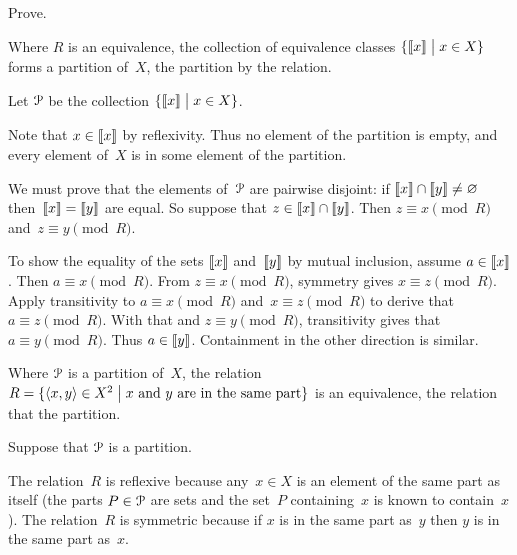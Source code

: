 \documentclass{ibl}  %
\begin{document}
\begin{problem} \label{ex:EquivClassesFormPartition}
Prove.
\begin{exes}
\begin{exercise} 
  Where $R$ is an equivalence, 
  the collection of equivalence classes 
  $\{\llbracket x \rrbracket \bigm| x\in X\}$ forms a partition of~$X$,
  the partition  by the relation.
\end{exercise}
\begin{answer}
  Let $\EuScript{P}$ be the collection $\{\llbracket x \rrbracket \bigm| x\in X\}$.
 
  Note that $x\in\llbracket x \rrbracket$ by reflexivity.
  Thus no element of the partition is empty, and 
  every element of~$X$ is in some element of the partition.

  We must prove that the elements of~$\EuScript{P}$ are pairwise disjoint:
  if $\llbracket x \rrbracket\cap\llbracket y \rrbracket\neq\varnothing$
  then~$\llbracket x \rrbracket=\llbracket y \rrbracket$ are equal.
  So suppose that $z\in\llbracket x \rrbracket\cap\llbracket y \rrbracket$.
  Then $z\equiv x\pmod R$ and~$z\equiv y\pmod R$.

  To show the equality of the sets $\llbracket x \rrbracket$ and~$\llbracket y \rrbracket$ 
  by mutual inclusion, assume $a\in\llbracket x \rrbracket$.
  Then $a\equiv x\pmod R$.
  From $z\equiv x\pmod R$, symmetry gives $x\equiv z\pmod R$.
  Apply transitivity to $a\equiv x\pmod R$ and~$x\equiv z\pmod R$ to
  derive that $a\equiv z\pmod R$.
  With that and $z\equiv y\pmod R$, transitivity gives
  that $a\equiv y\pmod R$. 
  Thus $a\in\llbracket y \rrbracket$.
  Containment in the other direction is similar.    
\end{answer}
\begin{exercise} 
  Where $\EuScript{P}$ is a partition of~$X$, 
  the relation 
  $R=\{\langle x,y\rangle\in X^2 \bigm| 
            \text{$x$ and~$y$ are in the same part}\}$ 
  is an equivalence, 
  the relation that  the partition. 
\end{exercise}
\begin{answer}
  Suppose that $\EuScript{P}$ is a partition. 

  The relation~$R$ is reflexive because any~$x\in X$ is an element of
  the same part as itself
  (the parts $P\in\EuScript{P}$ are sets and the set~$P$ containing~$x$
  is known to contain~$x$).
  The relation~$R$ is symmetric because if $x$ is in the same part as~$y$
  then $y$ is in the same part as~$x$.


\end{answer}
\end{exes}
\end{problem}
\end{document}
